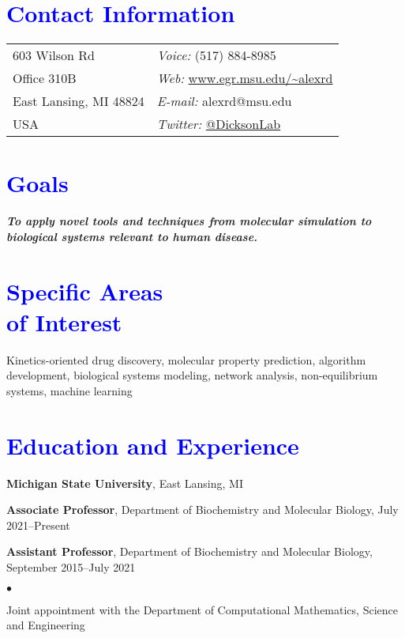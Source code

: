 \documentclass[margin,line]{res}
\newenvironment{list1}{
  \begin{list}{\ding{113}}{%
      \setlength{\itemsep}{0.05in}
      \setlength{\parsep}{0in} \setlength{\parskip}{0in}
      \setlength{\topsep}{0in} \setlength{\partopsep}{0in} 
      \setlength{\leftmargin}{0.17in}}}{\end{list}}
\newenvironment{list2}{
  \begin{list}{$\bullet$}{%
      \setlength{\itemsep}{0.03in}
      \setlength{\parsep}{0in} \setlength{\parskip}{0in}
      \setlength{\topsep}{0.05in} \setlength{\partopsep}{0in} 
      \setlength{\leftmargin}{0.2in}}}{\end{list}}
\begin{document}

\begin{resume}
\section{\sc \textcolor{blue}{Contact Information}}
\vspace{.05in}
\begin{tabular}{@{}p{2in}p{4in}}
603 Wilson Rd             & {\it Voice:}  (517) 884-8985 \\            
Office 310B               & {\it Web:} \url{www.egr.msu.edu/~alexrd} \\         
East Lansing, MI 48824  & {\it E-mail:}  alexrd@msu.edu\\
USA & {\it Twitter:} \url{@DicksonLab}\\
\end{tabular}

\section{\sc \textcolor{blue}{ Goals}}
{\bf{\emph{To apply novel tools and techniques from molecular simulation to biological systems relevant to human disease.}}}

\section{\sc \textcolor{blue}{ Specific Areas \\ of Interest}}
Kinetics-oriented drug discovery, molecular property prediction, algorithm development, biological systems modeling, network analysis,
non-equilibrium systems, machine learning

\section{\sc \textcolor{blue}{ Education and Experience}}
{\bf Michigan State University}, East Lansing, MI\\
\vspace {-0.05in}
\begin{list1}
\item[] {\bf Associate Professor}, Department of Biochemistry and Molecular Biology, July 2021--Present
\item[] {\bf Assistant Professor}, Department of Biochemistry and Molecular Biology, September 2015--July 2021
\begin{list2}
\item {Joint appointment with the Department of Computational Mathematics, Science and Engineering}
\end{list2}
\end{list1}


\end{resume}
\end{document}
